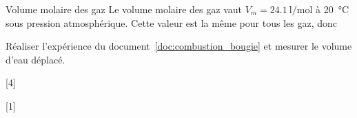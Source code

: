 \begin{doc}{Volume molaire des gaz}
  Le volume molaire des gaz vaut $V_m = \qty{24,1}{\litre\per\mole}$ à \qty{20}{\degreeCelsius} sous pression atmosphérique.
  Cette valeur est la même pour tous les gaz, donc 
\end{doc}

\mesure Réaliser l'expérience du document~\ref{doc:combustion_bougie} et mesurer le volume d'eau déplacé.

[4]

[1]